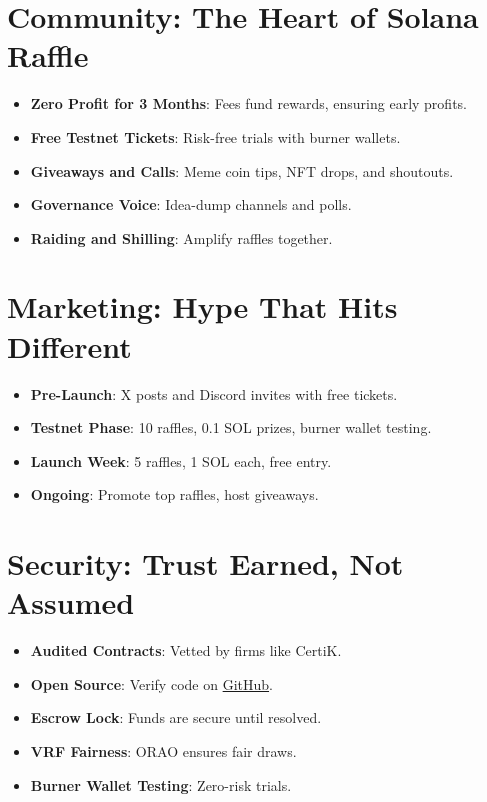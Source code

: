 \documentclass[12pt]{article}
\begin{document}
\section{Community: The Heart of Solana Raffle}
\begin{itemize}
    \item \textbf{Zero Profit for 3 Months}: Fees fund rewards, ensuring early profits.
    \item \textbf{Free Testnet Tickets}: Risk-free trials with burner wallets.
    \item \textbf{Giveaways and Calls}: Meme coin tips, NFT drops, and shoutouts.
    \item \textbf{Governance Voice}: Idea-dump channels and polls.
    \item \textbf{Raiding and Shilling}: Amplify raffles together.
\end{itemize}

\section{Marketing: Hype That Hits Different}
\begin{itemize}
    \item \textbf{Pre-Launch}: X posts and Discord invites with free tickets.
    \item \textbf{Testnet Phase}: 10 raffles, 0.1 SOL prizes, burner wallet testing.
    \item \textbf{Launch Week}: 5 raffles, 1 SOL each, free entry.
    \item \textbf{Ongoing}: Promote top raffles, host giveaways.
\end{itemize}

\section{Security: Trust Earned, Not Assumed}
\begin{itemize}
    \item \textbf{Audited Contracts}: Vetted by firms like CertiK.
    \item \textbf{Open Source}: Verify code on \href{https://github.com/kobby-pentangeli/solana-escrow}{GitHub}.
    \item \textbf{Escrow Lock}: Funds are secure until resolved.
    \item \textbf{VRF Fairness}: ORAO ensures fair draws.
    \item \textbf{Burner Wallet Testing}: Zero-risk trials.
\end{itemize}
\end{document}
